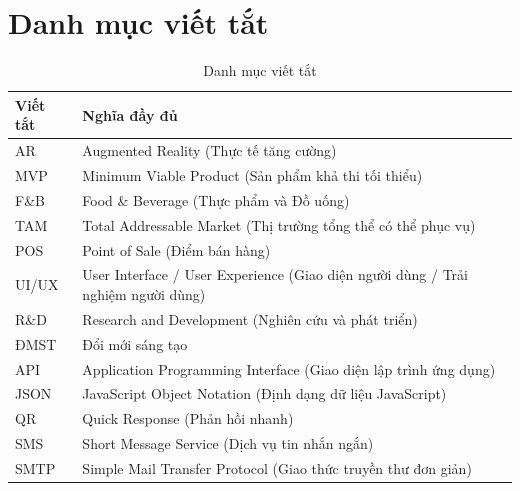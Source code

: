 \documentclass[12pt,a4paper]{article}
\begin{document}
\setcounter{page}{1} %
\pagestyle{fancy}
\fancyhf{} %
\fancyfoot[C]{\thepage} %
\renewcommand{\headrulewidth}{0.4pt} %
\renewcommand{\footrulewidth}{0pt}   %

\justifying %

\tableofcontents
\newpage

\listoftables
\newpage

\listoffigures
\newpage

\section*{Danh mục viết tắt} %

\begin{table}[H]
\centering
\caption{Danh mục viết tắt}
\label{tab:abbreviations}
\begin{tabular}{@{}p{3cm}@{\hspace{1cm}}p{10cm}@{}} %
    \toprule %
    \textbf{Viết tắt} & \textbf{Nghĩa đầy đủ} \\
    \midrule %
    AR & Augmented Reality (Thực tế tăng cường) \\
    MVP & Minimum Viable Product (Sản phẩm khả thi tối thiểu) \\
    F\&B & Food \& Beverage (Thực phẩm và Đồ uống) \\
    TAM & Total Addressable Market (Thị trường tổng thể có thể phục vụ) \\
    POS & Point of Sale (Điểm bán hàng) \\
    UI/UX & User Interface / User Experience (Giao diện người dùng / Trải nghiệm người dùng) \\
    R\&D & Research and Development (Nghiên cứu và phát triển) \\
    ĐMST & Đổi mới sáng tạo \\
    API & Application Programming Interface (Giao diện lập trình ứng dụng) \\
    JSON & JavaScript Object Notation (Định dạng dữ liệu JavaScript) \\
    QR & Quick Response (Phản hồi nhanh) \\
    SMS & Short Message Service (Dịch vụ tin nhắn ngắn) \\
    SMTP & Simple Mail Transfer Protocol (Giao thức truyền thư đơn giản) \\
    \bottomrule %
\end{tabular}
\end{table}
\end{document}
